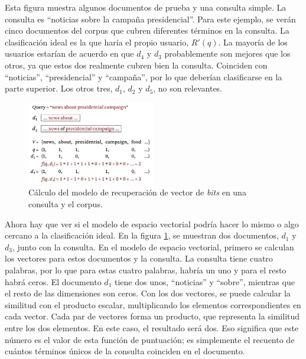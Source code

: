 Esta figura muestra algunos documentos de prueba y una consulta simple. La consulta es ``noticias sobre la campaña presidencial''. Para este ejemplo, se verán cinco documentos del corpus que cubren diferentes términos en la consulta. La clasificación ideal es la que haría el propio usuario, $R'(q)$. La mayoría de los usuarios estarían de acuerdo en que $d_4$ y $d_3$ probablemente son mejores que los otros, ya que estos dos realmente cubren bien la consulta. Coinciden con ``noticias'', ``presidencial'' y ``campaña'', por lo que deberían clasificarse en la parte superior. Los otros tres, $d_1$, $d_2$ y $d_5$, no son relevantes. \\

\begin{figure}[h]
\centering
\includegraphics[width=0.5\textwidth]{fotos/20.png}
\caption{Cálculo del modelo de recuperación de vector de \textit{bits} en una consulta y el corpus.}
\label{fig:6.5}
\end{figure}

Ahora hay que ver si el modelo de espacio vectorial podría hacer lo mismo o algo cercano a la clasificación ideal. En la figura \ref{fig:6.5}, se muestran dos documentos, $d_1$ y $d_3$, junto con la consulta. En el modelo de espacio vectorial, primero se calculan los vectores para estos documentos y la consulta. La consulta tiene cuatro palabras, por lo que para estas cuatro palabras, habría un uno y para el resto habrá ceros. El documento $d_1$ tiene dos unos, ``noticias'' y ``sobre'', mientras que el resto de las dimensiones son ceros. Con los dos vectores, se puede calcular la similitud con el producto escalar, multiplicando los elementos correspondientes en cada vector. Cada par de vectores forma un producto, que representa la similitud entre los dos elementos. En este caso, el resultado será dos. Eso significa que este número es el valor de esta función de puntuación; es simplemente el recuento de cuántos términos únicos de la consulta coinciden en el documento. \\

